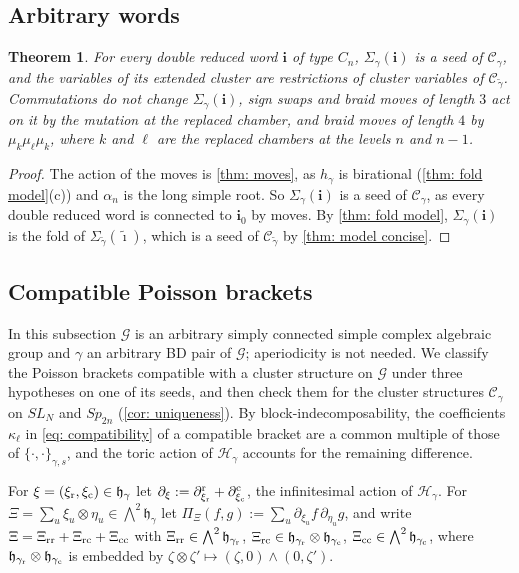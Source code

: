 \documentclass[a4paper]{amsart}
\numberwithin{equation}{section}
\newtheorem{theorem}{Theorem}[section]
\theoremstyle{definition}
\theoremstyle{remark}
\newcommand{\mfh}{\mathfrak{h}}
\newcommand{\mcG}{\mathcal{G}}
\newcommand{\mcH}{\mathcal{H}}
\newcommand{\mcC}{\mathcal{C}}
\newcommand{\bfi}{\mathbf{i}}
\newcommand{\tbfi}{\widetilde{\boldsymbol{\imath}}}
\newcommand{\tg}{\widetilde{\gamma}}
\newcommand{\rr}{{\rm r}}
\newcommand{\cc}{{\rm c}}
\newcommand{\toric}{\Pi}
\newcommand{\Sp}{Sp_{2n}}
\begin{document}
\subsection{Arbitrary words}
\begin{theorem}
  \label{thm: all words}
  For every double reduced word $\bfi$ of type $C_n$, $\Sigma_\gamma(\bfi)$ is a seed of $\mcC_\gamma$, and the variables of its extended cluster are restrictions of cluster variables of $\mcC_{\tg}$.
  Commutations do not change $\Sigma_\gamma(\bfi)$, sign swaps and braid moves of length $3$ act on it by the mutation at the replaced chamber, and braid moves of length $4$ by $\mu_k\mu_\ell\mu_k$, where $k$ and $\ell$ are the replaced chambers at the levels $n$ and $n-1$.
\end{theorem}
\begin{proof}
  The action of the moves is \cref{thm: moves}, as $h_\gamma$ is birational (\cref{thm: fold model}(c)) and $\alpha_n$ is the long simple root.
  So $\Sigma_\gamma(\bfi)$ is a seed of $\mcC_\gamma$, as every double reduced word is connected to $\bfi_0$ by moves.
  By \cref{thm: fold model}, $\Sigma_\gamma(\bfi)$ is the fold of $\Sigma_{\tg}(\tbfi)$, which is a seed of $\mcC_{\tg}$ by \cref{thm: model concise}.
\end{proof}

\subsection{Compatible Poisson brackets}
\label{sec: uniqueness}
In this subsection $\mcG$ is an arbitrary simply connected simple complex algebraic group and $\gamma$ an arbitrary BD pair of $\mcG$; aperiodicity is not needed.
We classify the Poisson brackets compatible with a cluster structure on $\mcG$ under three hypotheses on one of its seeds, and then check them for the cluster structures $\mcC_\gamma$ on $SL_N$ and $\Sp$ (\cref{cor: uniqueness}).
By block-indecomposability, the coefficients $\kappa_\ell$ in \eqref{eq: compatibility} of a compatible bracket are a common multiple of those of $\{\cdot,\cdot\}_{\gamma,s}$, and the toric action of $\mcH_\gamma$ accounts for the remaining difference.

For $\xi=(\xi_{\rr},\xi_{\cc})\in\mfh_\gamma$ let $\partial_\xi:=\partial^\rr_{\xi_{\rr}}+\partial^\cc_{\xi_{\cc}}$, the infinitesimal action of $\mcH_\gamma$.
For $\Xi=\sum_u\xi_u\otimes\eta_u\in\bigwedge^2\mfh_\gamma$ let $\toric_\Xi(f,g):=\sum_u\partial_{\xi_u}f\,\partial_{\eta_u}g$, and write $\Xi=\Xi_{\rm rr}+\Xi_{\rm rc}+\Xi_{\rm cc}$ with $\Xi_{\rm rr}\in\bigwedge^2\mfh_{\gamma_{\rr}}$, $\Xi_{\rm rc}\in\mfh_{\gamma_{\rr}}\otimes\mfh_{\gamma_{\cc}}$, $\Xi_{\rm cc}\in\bigwedge^2\mfh_{\gamma_{\cc}}$, where $\mfh_{\gamma_{\rr}}\otimes\mfh_{\gamma_{\cc}}$ is embedded by $\zeta\otimes\zeta'\mapsto(\zeta,0)\wedge(0,\zeta')$.
\end{document}
